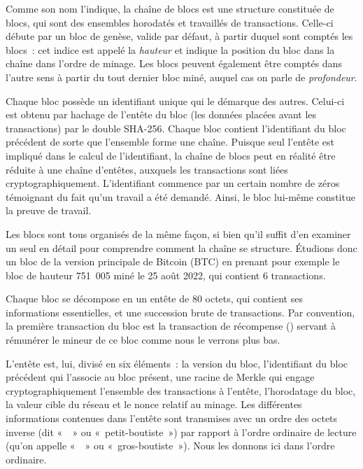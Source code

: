 Comme son nom l'indique, la chaîne de blocs est une structure constituée de blocs, qui sont des ensembles horodatés et travaillés de transactions. Celle-ci débute par un bloc de genèse, valide par défaut, à partir duquel sont comptés les blocs~: cet indice est appelé la \emph{hauteur} et indique la position du bloc dans la chaîne dans l'ordre de minage. Les blocs peuvent également être comptés dans l'autre sens à partir du tout dernier bloc miné, auquel cas on parle de \emph{profondeur}.

Chaque bloc possède un identifiant unique qui le démarque des autres. Celui-ci est obtenu par hachage de l'entête du bloc (les données placées avant les transactions) par le double SHA-256. Chaque bloc contient l'identifiant du bloc précédent de sorte que l'ensemble forme une chaîne. Puisque seul l'entête est impliqué dans le calcul de l'identifiant, la chaîne de blocs peut en réalité être réduite à une chaîne d'entêtes, auxquels les transactions sont liées cryptographiquement. L'identifiant commence par un certain nombre de zéros témoignant du fait qu'un travail a été demandé. Ainsi, le bloc lui-même constitue la preuve de travail. %

Les blocs sont tous organisés de la même façon, si bien qu'il suffit d'en examiner un seul en détail pour comprendre comment la chaîne se structure. Étudions donc un bloc de la version principale de Bitcoin (BTC) en prenant pour exemple le bloc de hauteur 751~005 miné le 25 août 2022, qui contient 6 transactions.




Chaque bloc se décompose en un entête de 80 octets, qui contient ses informations essentielles, et une succession brute de transactions. Par convention, la première transaction du bloc est la transaction de récompense () servant à rémunérer le mineur de ce bloc comme nous le verrons plus bas.

L'entête est, lui, divisé en six éléments~: la version du bloc, l'identifiant du bloc précédent qui l'associe au bloc présent, une racine de Merkle qui engage cryptographiquement l'ensemble des transactions à l'entête, l'horodatage du bloc, la valeur cible du réseau et le nonce relatif au minage. Les différentes informations contenues dans l'entête sont transmises avec un ordre des octets inverse (dit «~~» ou «~petit-boutiste~») par rapport à l'ordre ordinaire de lecture (qu'on appelle «~~» ou «~gros-boutiste~»). Nous les donnons ici dans l'ordre ordinaire.


